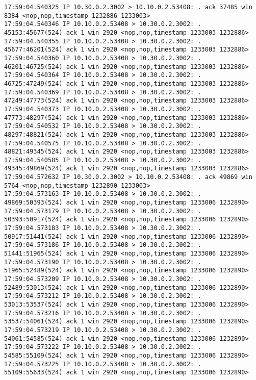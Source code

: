 \documentclass[a4paper,12pt]{article}
\begin{document}
\begin{Verbatim}
17:59:04.540325 IP 10.30.0.2.3002 > 10.10.0.2.53408: . ack 37485 win 8384 <nop,nop,timestamp 1232886 1233003>
17:59:04.540346 IP 10.10.0.2.53408 > 10.30.0.2.3002: . 45153:45677(524) ack 1 win 2920 <nop,nop,timestamp 1233003 1232886>
17:59:04.540355 IP 10.10.0.2.53408 > 10.30.0.2.3002: . 45677:46201(524) ack 1 win 2920 <nop,nop,timestamp 1233003 1232886>
17:59:04.540360 IP 10.10.0.2.53408 > 10.30.0.2.3002: . 46201:46725(524) ack 1 win 2920 <nop,nop,timestamp 1233003 1232886>
17:59:04.540364 IP 10.10.0.2.53408 > 10.30.0.2.3002: . 46725:47249(524) ack 1 win 2920 <nop,nop,timestamp 1233003 1232886>
17:59:04.540369 IP 10.10.0.2.53408 > 10.30.0.2.3002: . 47249:47773(524) ack 1 win 2920 <nop,nop,timestamp 1233003 1232886>
17:59:04.540373 IP 10.10.0.2.53408 > 10.30.0.2.3002: . 47773:48297(524) ack 1 win 2920 <nop,nop,timestamp 1233003 1232886>
17:59:04.540532 IP 10.10.0.2.53408 > 10.30.0.2.3002: . 48297:48821(524) ack 1 win 2920 <nop,nop,timestamp 1233003 1232886>
17:59:04.540575 IP 10.10.0.2.53408 > 10.30.0.2.3002: . 48821:49345(524) ack 1 win 2920 <nop,nop,timestamp 1233003 1232886>
17:59:04.540585 IP 10.10.0.2.53408 > 10.30.0.2.3002: . 49345:49869(524) ack 1 win 2920 <nop,nop,timestamp 1233003 1232886>
17:59:04.572632 IP 10.30.0.2.3002 > 10.10.0.2.53408: . ack 49869 win 5764 <nop,nop,timestamp 1232890 1233003>
17:59:04.573163 IP 10.10.0.2.53408 > 10.30.0.2.3002: . 49869:50393(524) ack 1 win 2920 <nop,nop,timestamp 1233006 1232890>
17:59:04.573179 IP 10.10.0.2.53408 > 10.30.0.2.3002: . 50393:50917(524) ack 1 win 2920 <nop,nop,timestamp 1233006 1232890>
17:59:04.573183 IP 10.10.0.2.53408 > 10.30.0.2.3002: . 50917:51441(524) ack 1 win 2920 <nop,nop,timestamp 1233006 1232890>
17:59:04.573186 IP 10.10.0.2.53408 > 10.30.0.2.3002: . 51441:51965(524) ack 1 win 2920 <nop,nop,timestamp 1233006 1232890>
17:59:04.573190 IP 10.10.0.2.53408 > 10.30.0.2.3002: . 51965:52489(524) ack 1 win 2920 <nop,nop,timestamp 1233006 1232890>
17:59:04.573209 IP 10.10.0.2.53408 > 10.30.0.2.3002: . 52489:53013(524) ack 1 win 2920 <nop,nop,timestamp 1233006 1232890>
17:59:04.573212 IP 10.10.0.2.53408 > 10.30.0.2.3002: . 53013:53537(524) ack 1 win 2920 <nop,nop,timestamp 1233006 1232890>
17:59:04.573216 IP 10.10.0.2.53408 > 10.30.0.2.3002: . 53537:54061(524) ack 1 win 2920 <nop,nop,timestamp 1233006 1232890>
17:59:04.573219 IP 10.10.0.2.53408 > 10.30.0.2.3002: . 54061:54585(524) ack 1 win 2920 <nop,nop,timestamp 1233006 1232890>
17:59:04.573222 IP 10.10.0.2.53408 > 10.30.0.2.3002: . 54585:55109(524) ack 1 win 2920 <nop,nop,timestamp 1233006 1232890>
17:59:04.573225 IP 10.10.0.2.53408 > 10.30.0.2.3002: . 55109:55633(524) ack 1 win 2920 <nop,nop,timestamp 1233006 1232890>

\end{Verbatim}
\end{document}
